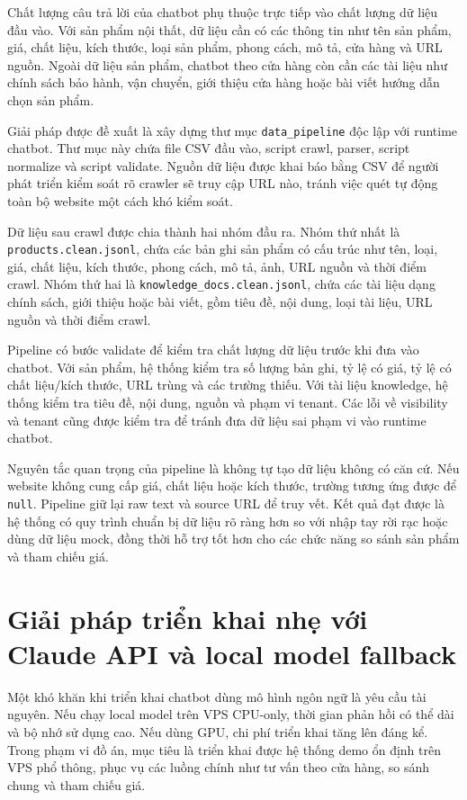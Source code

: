 \documentclass[../DoAn.tex]{subfiles}
\begin{document}
Chất lượng câu trả lời của chatbot phụ thuộc trực tiếp vào chất lượng dữ liệu đầu vào. Với sản phẩm nội thất, dữ liệu cần có các thông tin như tên sản phẩm, giá, chất liệu, kích thước, loại sản phẩm, phong cách, mô tả, cửa hàng và URL nguồn. Ngoài dữ liệu sản phẩm, chatbot theo cửa hàng còn cần các tài liệu như chính sách bảo hành, vận chuyển, giới thiệu cửa hàng hoặc bài viết hướng dẫn chọn sản phẩm.

Giải pháp được đề xuất là xây dựng thư mục \texttt{data\_pipeline} độc lập với runtime chatbot. Thư mục này chứa file CSV đầu vào, script crawl, parser, script normalize và script validate. Nguồn dữ liệu được khai báo bằng CSV để người phát triển kiểm soát rõ crawler sẽ truy cập URL nào, tránh việc quét tự động toàn bộ website một cách khó kiểm soát.

Dữ liệu sau crawl được chia thành hai nhóm đầu ra. Nhóm thứ nhất là \texttt{products.clean.jsonl}, chứa các bản ghi sản phẩm có cấu trúc như tên, loại, giá, chất liệu, kích thước, phong cách, mô tả, ảnh, URL nguồn và thời điểm crawl. Nhóm thứ hai là \texttt{knowledge\_docs.clean.jsonl}, chứa các tài liệu dạng chính sách, giới thiệu hoặc bài viết, gồm tiêu đề, nội dung, loại tài liệu, URL nguồn và thời điểm crawl.

Pipeline có bước validate để kiểm tra chất lượng dữ liệu trước khi đưa vào chatbot. Với sản phẩm, hệ thống kiểm tra số lượng bản ghi, tỷ lệ có giá, tỷ lệ có chất liệu/kích thước, URL trùng và các trường thiếu. Với tài liệu knowledge, hệ thống kiểm tra tiêu đề, nội dung, nguồn và phạm vi tenant. Các lỗi về visibility và tenant cũng được kiểm tra để tránh đưa dữ liệu sai phạm vi vào runtime chatbot.

Nguyên tắc quan trọng của pipeline là không tự tạo dữ liệu không có căn cứ. Nếu website không cung cấp giá, chất liệu hoặc kích thước, trường tương ứng được để \texttt{null}. Pipeline giữ lại raw text và source URL để truy vết. Kết quả đạt được là hệ thống có quy trình chuẩn bị dữ liệu rõ ràng hơn so với nhập tay rời rạc hoặc dùng dữ liệu mock, đồng thời hỗ trợ tốt hơn cho các chức năng so sánh sản phẩm và tham chiếu giá.

\section{Giải pháp triển khai nhẹ với Claude API và local model fallback}
\label{section:5.5}

Một khó khăn khi triển khai chatbot dùng mô hình ngôn ngữ là yêu cầu tài nguyên. Nếu chạy local model trên VPS CPU-only, thời gian phản hồi có thể dài và bộ nhớ sử dụng cao. Nếu dùng GPU, chi phí triển khai tăng lên đáng kể. Trong phạm vi đồ án, mục tiêu là triển khai được hệ thống demo ổn định trên VPS phổ thông, phục vụ các luồng chính như tư vấn theo cửa hàng, so sánh chung và tham chiếu giá.
\end{document}
